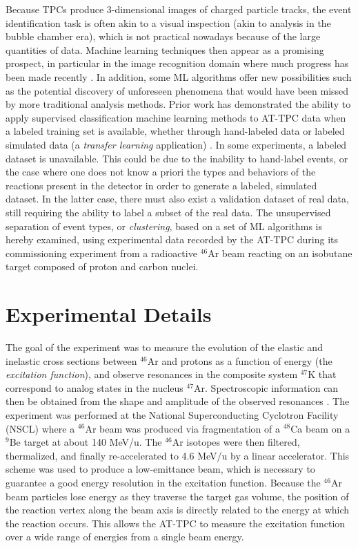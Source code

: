 \documentclass[review,number,sort&compress]{elsarticle}
\begin{document}
Because TPCs produce 3-dimensional images of charged particle tracks, the event identification task is often akin to a visual inspection (akin to analysis in the bubble chamber era), which is not practical nowadays because of the large quantities of data. Machine learning techniques then appear as a promising prospect, in particular in the image recognition domain where much progress has been made recently \cite{mehta2019}. In addition, some ML algorithms offer new possibilities such as the potential discovery of unforeseen phenomena that would have been missed by more traditional analysis methods. Prior work has demonstrated the ability to apply supervised classification machine learning methods to AT-TPC data when a labeled training set is available, whether through hand-labeled data or labeled simulated data (a {\em transfer learning} application) \cite{Kuchera2019}. In some experiments, a labeled dataset is unavailable. This could be  due to the inability to hand-label events, or the case where one does not know a priori the types and behaviors of the reactions present in the detector in order to generate a labeled, simulated dataset. In the latter case, there must also exist a validation dataset of real data, still requiring the ability to label a subset of the real data. The unsupervised separation of event types, or {\em clustering}, based on a set of ML algorithms is hereby examined, using experimental data recorded by the AT-TPC during its commissioning experiment from a radioactive $^{46}$Ar beam reacting on an isobutane target composed of proton and carbon nuclei. 

\section{Experimental Details} 
The goal of the experiment was to measure the evolution of the elastic and inelastic cross sections between $^{46}$Ar and protons as a function of energy (the {\em excitation function}), and observe resonances in the composite system $^{47}$K that correspond to analog states in the nucleus $^{47}$Ar. Spectroscopic information can then be obtained from the shape and amplitude of the observed resonances \cite{Bradt2018}. 
The experiment was performed at the National Superconducting Cyclotron Facility (NSCL) where a $^{46}$Ar beam was produced via fragmentation of a $^{48}$Ca beam on a $^9$Be target at about 140 MeV/u. The $^{46}$Ar isotopes were then filtered, thermalized, and finally re-accelerated to 4.6 MeV/u by a linear accelerator. This scheme was used to produce a low-emittance beam, which is necessary to guarantee a good energy resolution in the excitation function. Because the  $^{46}$Ar beam particles lose energy as they traverse the target gas volume, the position of the reaction vertex along the beam axis is directly related to the energy at which the reaction occurs. This allows the AT-TPC to measure the excitation function over a wide range of energies from a single beam energy.
\end{document}
